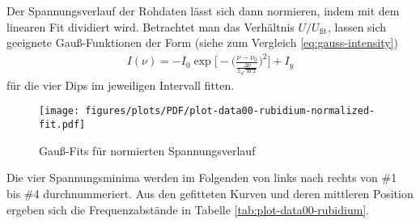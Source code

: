 \noindent Der Spannungsverlauf der Rohdaten lässt sich dann normieren, indem mit dem linearen Fit dividiert wird. Betrachtet man das Verhältnis $U/U_{\text{fit}}$,
lassen sich geeignete Gauß-Funktionen der Form (siehe zum Vergleich \eqref{eq:gauss-intensity})
\begin{align}
    I(\nu) = - I_{0} \exp \biggl[- \biggl( \frac{\nu - \nu_{0}}{\frac{\Delta \nu}{2 \sqrt{\ln 2}}} \biggr)^2 \biggr] + I_{y}
    \label{eq:gauss-fit}
\end{align}
für die vier Dips im jeweiligen Intervall fitten.
\begin{figure}[H]
    \centering
    \texttt{[image: figures/plots/PDF/plot-data00-rubidium-normalized-fit.pdf]}
    \caption{Gauß-Fits für normierten Spannungsverlauf}
    \label{fig:plot-data00-rubidium-normalized-fit}
\end{figure}
\noindent Die vier Spannungsminima werden im Folgenden von links nach rechts von \#1 bis \#4 durchnummeriert. Aus den gefitteten Kurven und deren mittleren Position ergeben sich die Frequenzabstände in Tabelle \ref{tab:plot-data00-rubidium}. 
